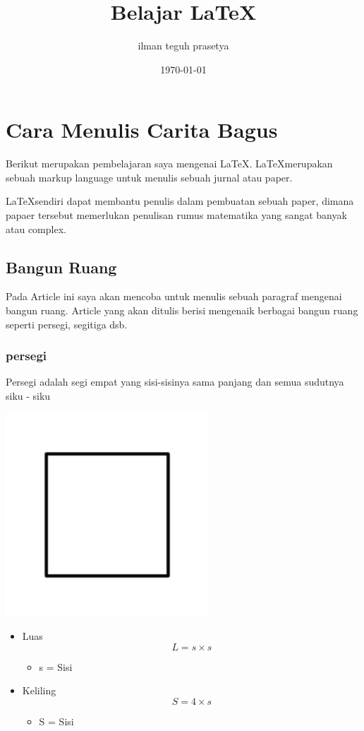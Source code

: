 \documentclass[12pt]{article}
\begin{document}
	\tableofcontents
	\title{Belajar \LaTeX}
	\author{ilman teguh prasetya}
	\date{\today}
	\maketitle
	\section{Cara Menulis Carita Bagus}
		Berikut merupakan pembelajaran saya mengenai \LaTeX. \LaTeX merupakan sebuah markup language untuk menulis sebuah jurnal atau paper.
		
		\LaTeX  sendiri dapat membantu penulis dalam pembuatan sebuah paper, dimana papaer tersebut memerlukan penulisan rumus matematika yang sangat banyak atau complex.
		\subsection{Bangun Ruang}
		Pada Article ini saya akan mencoba untuk menulis sebuah paragraf mengenai bangun ruang. Article yang akan ditulis berisi mengenaik berbagai bangun ruang seperti persegi, segitiga dsb.
			\subsubsection{persegi}
			Persegi adalah segi empat yang sisi-sisinya sama panjang dan semua sudutnya siku - siku
			\begin{center}
						\includegraphics[width=3in]{persegi.png}
			\end{center}
			\begin{itemize}
			\item Luas 
			$$L=s \times s$$
			\begin{itemize}
			\item s = Sisi
			\end{itemize}
			\item Keliling
			$$S = 4 \times s$$
			\begin{itemize}
			\item S = Sisi
			\end{itemize}
			\end{itemize}
\end{document}

